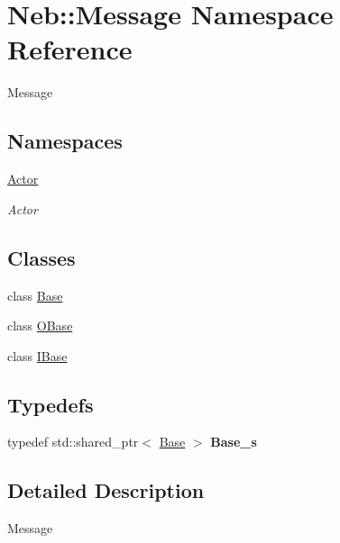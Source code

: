 \hypertarget{namespaceNeb_1_1Message}{\section{Neb\-:\-:Message Namespace Reference}
\label{namespaceNeb_1_1Message}
}


Message  


\subsection*{Namespaces}
\begin{DoxyCompactItemize}
\item 
\hyperlink{namespaceNeb_1_1Message_1_1Actor}{Actor}
\begin{DoxyCompactList}\small\item\em Actor \end{DoxyCompactList}\end{DoxyCompactItemize}
\subsection*{Classes}
\begin{DoxyCompactItemize}
\item 
class \hyperlink{classNeb_1_1Message_1_1Base}{Base}
\item 
class \hyperlink{classNeb_1_1Message_1_1OBase}{O\-Base}
\item 
class \hyperlink{classNeb_1_1Message_1_1IBase}{I\-Base}
\end{DoxyCompactItemize}
\subsection*{Typedefs}
\begin{DoxyCompactItemize}
\item 
\hypertarget{namespaceNeb_1_1Message_a790a36ad380408033e76d4f70ee4a229}{typedef std\-::shared\-\_\-ptr$<$ \hyperlink{classNeb_1_1Message_1_1Base}{Base} $>$ {\bfseries Base\-\_\-s}}\label{namespaceNeb_1_1Message_a790a36ad380408033e76d4f70ee4a229}

\end{DoxyCompactItemize}


\subsection{Detailed Description}
Message 